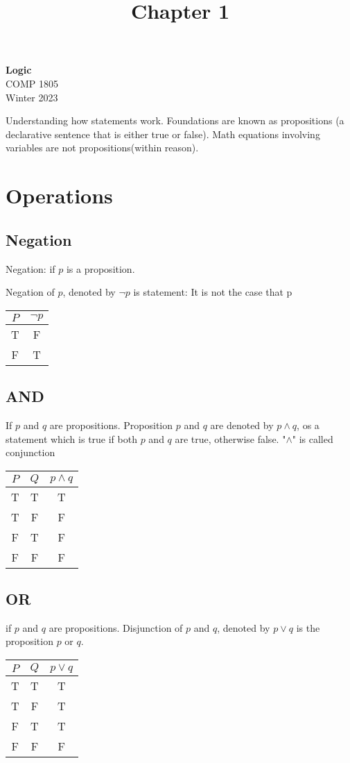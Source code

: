 \documentclass[11pt]{article}
\theoremstyle{definition}
\newcommand\chaptercounter{1}
\begin{document}
\title{Chapter \chaptercounter}
\thispagestyle{empty}

\begin{center}
{\LARGE \bf Logic}\\
{\large COMP 1805}\\
Winter 2023
\end{center}

Understanding how statements work. Foundations are known as propositions (a declarative sentence that is either true or false). Math equations involving variables are not propositions(within reason).

\section{Operations}
\subsection{Negation}
Negation: if $p$ is a proposition.

Negation of $p$, denoted by $\neg p $ is statement: It is not the case that p
\begin{center}
	\begin{tabular}{ |c|c| } 
 		\hline
 		$P$ & $\neg p$ \\
		\hline
 		T & F \\
 		F & T \\
 		\hline
	\end{tabular}
\end{center}
\subsection{AND}
If $p$ and $q$ are propositions. Proposition $p$ and $q$ are denoted by $p \land q$, os a statement which is true if both $p$ and $q$ are true, otherwise false. "$\land$" is called conjunction
\begin{center}
	\begin{tabular}{ |c|c|c| } 
 		\hline
 		$P$ & $Q$ & $p \land q$\\
		\hline
 		T & T  & T\\
 		T & F & F\\
		F & T & F\\
		F & F & F \\
 		\hline
	\end{tabular}
\end{center}
\subsection{OR}
if $p$ and $q$ are propositions. Disjunction of $p$ and $q$, denoted by $p \lor q$ is the proposition $p$ or $q$.
\begin{center}
	\begin{tabular}{ |c|c|c| } 
 		\hline
 		$P$ & $Q$ & $p \lor q$\\
		\hline
 		T & T  & T\\
 		T & F & T\\
		F & T & T\\
		F & F & F \\
 		\hline
	\end{tabular}
\end{center}
\end{document}
